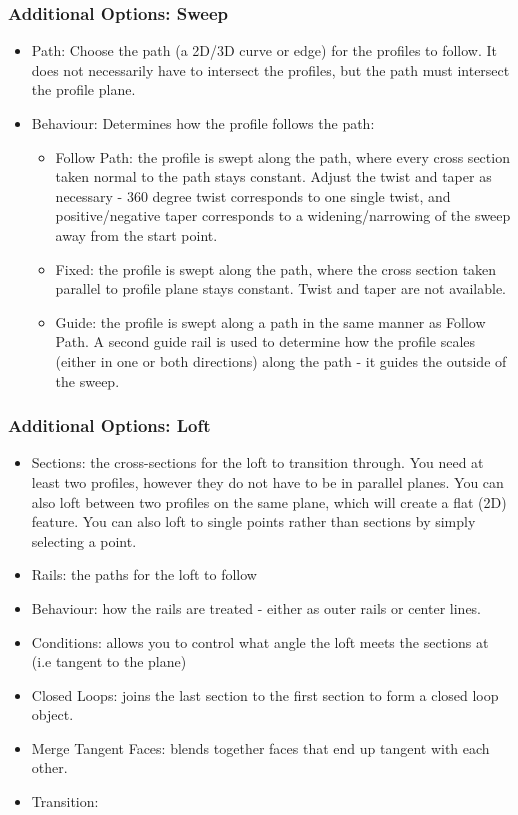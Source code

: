 \subsubsection{Additional Options: Sweep}

\begin{itemize}
    \item Path: Choose the path (a 2D/3D curve or edge) for the profiles to follow. It does not necessarily have to intersect the profiles, but the path must intersect the profile plane.
    \item Behaviour: Determines how the profile follows the path:
    \begin{itemize}
        \item Follow Path: the profile is swept along the path, where every cross section taken normal to the path stays constant. Adjust the twist and taper as necessary - 360 degree twist corresponds to one single twist, and positive/negative taper corresponds to a widening/narrowing of the sweep away from the start point.
        \item Fixed: the profile is swept along the path, where the cross section taken parallel to profile plane stays constant. Twist and taper are not available.
        \item Guide: the profile is swept along a path in the same manner as Follow Path. A second guide rail is used to determine how the profile scales (either in one or both directions) along the path - it guides the outside of the sweep.
    \end{itemize}
    
\end{itemize}


\subsubsection{Additional Options: Loft}

\begin{itemize}
    \item Sections: the cross-sections for the loft to transition through. You need at least two profiles, however they do not have to be in parallel planes. You can also loft between two profiles on the same plane, which will create a flat (2D) feature. You can also loft to single points rather than sections by simply selecting a point.
    \item Rails: the paths for the loft to follow
    \item Behaviour: how the rails are treated - either as outer rails or center lines.
    \item Conditions: allows you to control what angle the loft meets the sections at (i.e tangent to the plane)
    \item Closed Loops: joins the last section to the first section to form a closed loop object.
    \item Merge Tangent Faces: blends together faces that end up tangent with each other.
    \item Transition: 

\end{itemize}

